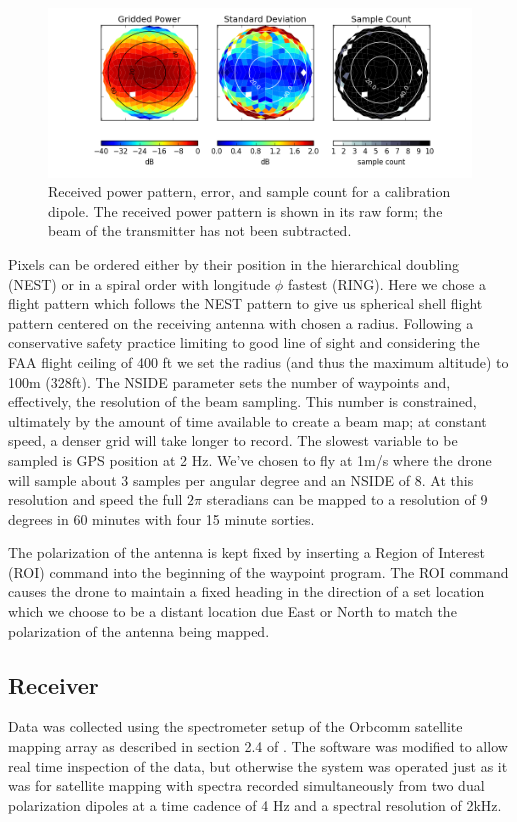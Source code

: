 \documentclass[preprint2,numberedappendix,tighten,twocolappendix]{aastex6}
\begin{document}
\begin{figure}[ht]
\begin{center}
\includegraphics[width=\textwidth]{figures/GB_power_rms_count.png}
\caption{Received power pattern, error, and sample count for a calibration dipole. The received power pattern is shown in its raw form; the beam of the transmitter has not been subtracted.}
\label{fig:beam_std_count}
\end{center}
\end{figure}
Pixels can be ordered either by their position in the hierarchical doubling (NEST) or in a spiral order with  longitude $\phi$ fastest (RING).  Here we chose a flight pattern which follows the NEST pattern to give us spherical shell flight pattern centered on the receiving antenna with chosen a radius. Following a conservative safety practice limiting to good line of sight and considering the FAA flight ceiling of 400 ft we set the radius (and thus the maximum altitude) to 100m (328ft). The NSIDE parameter sets the number of waypoints and, effectively, the resolution of the beam sampling.  This number is constrained, ultimately by the amount of time available to create a beam map; at constant speed, a denser grid will take longer to record.  The slowest variable to be sampled is GPS position at 2 Hz. We've chosen to fly at 1m/s where the drone will sample about 3 samples per angular degree and an NSIDE of 8.  At this resolution and speed the full $2\pi$ steradians can be mapped to a resolution of 9 degrees in 60 minutes with four 15 minute sorties.

The polarization of the antenna is kept fixed by inserting a Region of Interest (ROI) command into the beginning of the waypoint program.  The ROI command causes the drone to maintain a fixed heading in the direction of a set location which we choose to be a distant location due East or North to match the polarization of the antenna being mapped.


\subsection{Receiver}
Data was collected using the spectrometer setup of the Orbcomm satellite mapping array as described in section 2.4 of \citet{2016:NebenHERAdish}. The software was modified to allow real time inspection of the data, but otherwise the system was operated just as it was for satellite mapping with spectra recorded simultaneously from two dual polarization dipoles at a time cadence of 4 Hz and a spectral resolution of 2kHz. 
\end{document}
